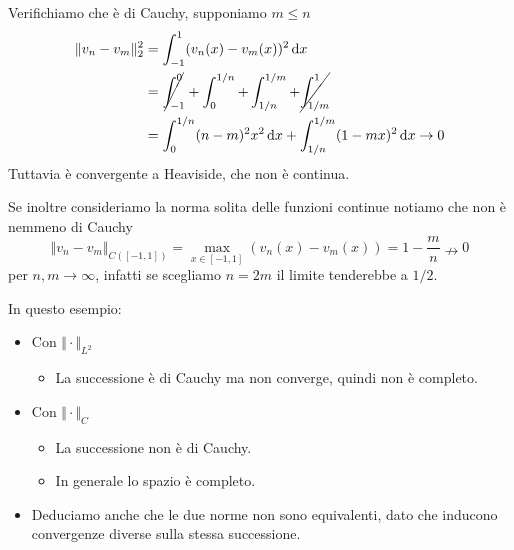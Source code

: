\begin{itemize}
\begin{figure}[htpb]
\begin{tikzpicture}[x=0.75pt,y=0.75pt,yscale=-1,xscale=1]
              \end{tikzpicture}

          \end{figure}
          \FloatBarrier

          Verifichiamo che è di Cauchy, supponiamo $\displaystyle m\leq n$
          \begin{align*}
              \Vert v_{n} -v_{m}\Vert _{2}^{2} & =\int _{-1}^{1}(v_{n}(x) -v_{m}(x))^{2} \dx                                            \\
                                               & =\cancel{\int _{-1}^{0}} +\int _{0}^{1/n} +\int _{1/n}^{1/m} +\cancel{\int _{1/m}^{1}} \\
                                               & =\int _{0}^{1/n}(n-m)^{2} x^{2} \dx+\int _{1/n}^{1/m}(1-mx)^{2} \dx\rightarrow 0
          \end{align*}Tuttavia è convergente a Heaviside, che non è continua.

          Se inoltre consideriamo la norma solita delle funzioni continue notiamo che non è nemmeno di Cauchy
          \begin{equation*}
              \Vert v_{n} -v_{m}\Vert _{C([ -1,1])} =\max_{x\in [ -1,1]}(v_{n}(x) -v_{m}(x)) =1-\frac{m}{n} \nrightarrow 0
          \end{equation*}per $n,m\rightarrow \infty $, infatti se scegliamo $n=2m$ il limite tenderebbe a $1/2$.
\end{itemize}

In questo esempio:
\begin{itemize}
    \item Con $\displaystyle \Vert \cdotp \Vert _{L^{2}}$
          \begin{itemize}
              \item La successione è di Cauchy ma non converge, quindi non è completo.
          \end{itemize}
    \item Con $\Vert \cdotp \Vert _{C}$
          \begin{itemize}
              \item La successione non è di Cauchy.
              \item In generale lo spazio è completo.
          \end{itemize}
    \item Deduciamo anche che le due norme non sono equivalenti, dato che inducono convergenze diverse sulla stessa successione.
\end{itemize}

